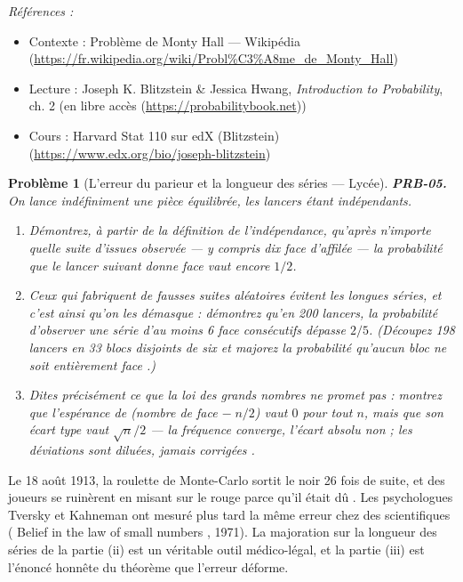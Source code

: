 \documentclass[11pt]{article}
\newtheorem{problem}{Problème}
\newenvironment{refs}{\par\small\noindent\emph{Références :}\begin{itemize}\setlength\itemsep{0pt}}{\end{itemize}\normalsize}
\begin{document}
\begin{refs}
\item Contexte : Problème de Monty Hall --- Wikipédia (\url{https://fr.wikipedia.org/wiki/Probl%C3%A8me_de_Monty_Hall})
\item Lecture : Joseph K. Blitzstein \& Jessica Hwang, \textit{Introduction to Probability}, ch. 2 (en libre accès (\url{https://probabilitybook.net}))
\item Cours : Harvard Stat 110 sur edX (Blitzstein) (\url{https://www.edx.org/bio/joseph-blitzstein})
\end{refs}

\bigskip

\begin{problem}[{L'erreur du parieur et la longueur des séries --- Lycée}]
\textbf{PRB-05.} On lance indéfiniment une pièce équilibrée, les lancers étant indépendants.
\begin{enumerate}
\item[(i)] Démontrez, à partir de la définition de l'indépendance, qu'après n'importe quelle suite
d'issues observée --- y compris dix \og{} face \fg{} d'affilée --- la probabilité que le lancer suivant donne
\og{} face \fg{} vaut encore $ 1/2 $.
\item[(ii)] Ceux qui fabriquent de fausses suites \og{} aléatoires \fg{} évitent les longues séries, et c'est
ainsi qu'on les démasque : démontrez qu'en 200 lancers, la probabilité d'observer une série d'au
moins 6 \og{} face \fg{} consécutifs dépasse $ 2/5 $. (Découpez 198 lancers en 33 blocs disjoints de
six et majorez la probabilité qu'aucun bloc ne soit entièrement \og{} face \fg{}.)
\item[(iii)] Dites
précisément ce que la loi des grands nombres ne promet \textit{pas} : montrez que l'espérance de
(nombre de \og{} face \fg{} $ - \; n/2 $) vaut $ 0 $ pour tout $ n $, mais que son écart type vaut
$ \sqrt{n}/2 $ --- la fréquence converge, l'écart absolu non ; les déviations sont diluées, jamais
\og{} corrigées \fg{}.
\end{enumerate}

\end{problem}

\noindent Le 18 août 1913, la roulette de Monte-Carlo sortit le noir 26 fois de suite, et
des joueurs se ruinèrent en misant sur le rouge \og{} parce qu'il était dû \fg{}. Les psychologues Tversky
et Kahneman ont mesuré plus tard la même erreur chez des scientifiques (\og{} Belief in the law of
small numbers \fg{}, 1971). La majoration sur la longueur des séries de la partie (ii) est un
véritable outil médico-légal, et la partie (iii) est l'énoncé honnête du théorème que l'erreur
déforme.
\end{document}
